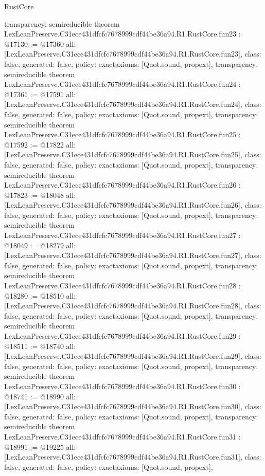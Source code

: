 \begin{lexlean}{RustCore}
\begin{coremodule}
{  transparency: semireducible
}
theorem LexLeanPreserve.C31ece431dfcfc7678999cdf44be36a94.R1.RustCore.fun23 : @17130 := @17360 {
  all: [LexLeanPreserve.C31ece431dfcfc7678999cdf44be36a94.R1.RustCore.fun23],
  class: false,
  generated: false,
  policy: exact{axioms: [Quot.sound, propext]},
  transparency: semireducible
}
theorem LexLeanPreserve.C31ece431dfcfc7678999cdf44be36a94.R1.RustCore.fun24 : @17361 := @17591 {
  all: [LexLeanPreserve.C31ece431dfcfc7678999cdf44be36a94.R1.RustCore.fun24],
  class: false,
  generated: false,
  policy: exact{axioms: [Quot.sound, propext]},
  transparency: semireducible
}
theorem LexLeanPreserve.C31ece431dfcfc7678999cdf44be36a94.R1.RustCore.fun25 : @17592 := @17822 {
  all: [LexLeanPreserve.C31ece431dfcfc7678999cdf44be36a94.R1.RustCore.fun25],
  class: false,
  generated: false,
  policy: exact{axioms: [Quot.sound, propext]},
  transparency: semireducible
}
theorem LexLeanPreserve.C31ece431dfcfc7678999cdf44be36a94.R1.RustCore.fun26 : @17823 := @18048 {
  all: [LexLeanPreserve.C31ece431dfcfc7678999cdf44be36a94.R1.RustCore.fun26],
  class: false,
  generated: false,
  policy: exact{axioms: [Quot.sound, propext]},
  transparency: semireducible
}
theorem LexLeanPreserve.C31ece431dfcfc7678999cdf44be36a94.R1.RustCore.fun27 : @18049 := @18279 {
  all: [LexLeanPreserve.C31ece431dfcfc7678999cdf44be36a94.R1.RustCore.fun27],
  class: false,
  generated: false,
  policy: exact{axioms: [Quot.sound, propext]},
  transparency: semireducible
}
theorem LexLeanPreserve.C31ece431dfcfc7678999cdf44be36a94.R1.RustCore.fun28 : @18280 := @18510 {
  all: [LexLeanPreserve.C31ece431dfcfc7678999cdf44be36a94.R1.RustCore.fun28],
  class: false,
  generated: false,
  policy: exact{axioms: [Quot.sound, propext]},
  transparency: semireducible
}
theorem LexLeanPreserve.C31ece431dfcfc7678999cdf44be36a94.R1.RustCore.fun29 : @18511 := @18740 {
  all: [LexLeanPreserve.C31ece431dfcfc7678999cdf44be36a94.R1.RustCore.fun29],
  class: false,
  generated: false,
  policy: exact{axioms: [Quot.sound, propext]},
  transparency: semireducible
}
theorem LexLeanPreserve.C31ece431dfcfc7678999cdf44be36a94.R1.RustCore.fun30 : @18741 := @18990 {
  all: [LexLeanPreserve.C31ece431dfcfc7678999cdf44be36a94.R1.RustCore.fun30],
  class: false,
  generated: false,
  policy: exact{axioms: [Quot.sound, propext]},
  transparency: semireducible
}
theorem LexLeanPreserve.C31ece431dfcfc7678999cdf44be36a94.R1.RustCore.fun31 : @18991 := @19225 {
  all: [LexLeanPreserve.C31ece431dfcfc7678999cdf44be36a94.R1.RustCore.fun31],
  class: false,
  generated: false,
  policy: exact{axioms: [Quot.sound, propext]},
}
\end{coremodule}
\end{lexlean}
